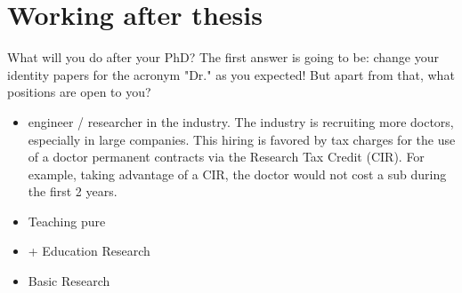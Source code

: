 \section{Working after thesis}
What will you do after your PhD?
The first answer is going to be: change your identity papers for the acronym "Dr." as you expected!
But apart from that, what positions are open to you?
\begin{itemize}
  \item engineer / researcher in the industry. The industry is recruiting more doctors, especially in large companies. This hiring is favored by tax charges for the use of a doctor permanent contracts via the Research Tax Credit (CIR). For example, taking advantage of a CIR, the doctor would not cost a sub during the first 2 years.
  \item Teaching pure
  \item + Education Research
  \item Basic Research
\end{itemize}

